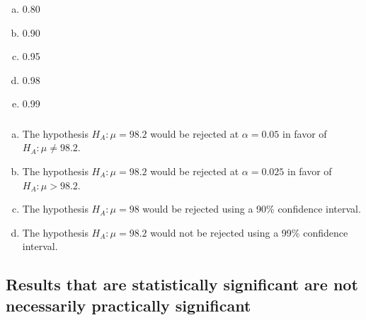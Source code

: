 \documentclass[11pt,containsverbatim,handout,xcolor=xelatex,dvipsnames,table]{beamer}
\newcommand{\solnMult}[1]{#1}
\begin{document}

\begin{frame}
\frametitle{}


\begin{enumerate}[(a)]
\item 0.80
\item 0.90
\item 0.95
\item \solnMult{0.98}
\item 0.99
\end{enumerate}

\end{frame}


\begin{frame}
\frametitle{}


\begin{enumerate}[(a)]
\item The hypothesis $H_A: \mu = 98.2$ would be rejected at $\alpha = 0.05$ in favor of $H_A: \mu \ne 98.2$.
\item The hypothesis $H_A: \mu = 98.2$ would be rejected at $\alpha = 0.025$ in favor of $H_A: \mu > 98.2$.
\item \solnMult{The hypothesis $H_A: \mu = 98$ would be rejected using a 90\% confidence interval.}
\item The hypothesis $H_A: \mu = 98.2$ would not be rejected using a 99\% confidence interval.
\end{enumerate}

\end{frame}


\subsection{Results that are statistically significant are not necessarily practically significant}
\label{mi2}

\end{document}
